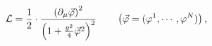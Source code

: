 \begin{equation}
{\cal L}=\frac{1}{2}\cdot\frac{\left(\partial_{\mu}\vec{\varphi}\right)^2}{\left(1+\frac{g^2}{4}\vec{\varphi}^2\right)^2} \qquad
\left(\vec{\varphi}=(\varphi^1,\cdots, \varphi^N)\right),
\label{eqn:lagrangian1}
\end{equation}

